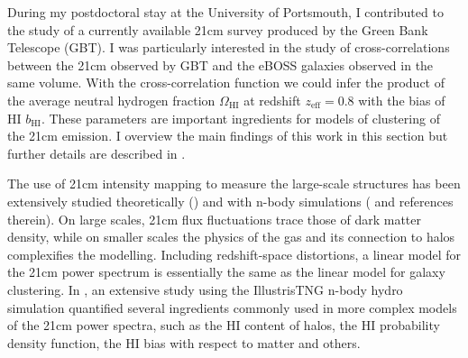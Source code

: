During my postdoctoral stay at the University of Portsmouth, 
I contributed to the study of a currently available 21cm survey produced by the Green Bank Telescope (GBT).
I was particularly interested in the study of cross-correlations between the 21cm 
observed by GBT and the eBOSS galaxies observed in the same volume. 
With the cross-correlation function we could infer the product of the average neutral hydrogen fraction 
$\Omega_\text{HI}$ at redshift $z_\text{eff} = 0.8$ with the bias of HI $b_\text{HI}$.  
These parameters are important ingredients for models of clustering of the 21cm emission.
I overview the main findings of this work in this section but further details 
are described in \cite{wolzConstraintsCrosscorrelationEBOSS2022}. 

The use of 21cm intensity mapping to measure the large-scale structures has been 
extensively studied theoretically 
(\cite{bharadwajUsingHIProbe2001,
battyeNeutralHydrogenSurveys2004,
mcquinnCosmologicalParameterEstimation2006,
changBaryonAcousticOscillation2008a}) 
and with n-body simulations 
(\cite{mesinger21CMFASTFastSeminumerical2011,
villaescusa-navarroIngredients21Cm2018} and references therein). 
On large scales, 21cm flux fluctuations trace those of dark matter density, while on smaller scales 
the physics of the gas and its connection to halos complexifies the modelling.  
Including redshift-space distortions, a linear model for the 21cm power spectrum is essentially the 
same as the linear model for galaxy clustering. 
In \cite{villaescusa-navarroIngredients21Cm2018}, an extensive study using the IllustrisTNG 
n-body hydro simulation quantified several ingredients commonly used in more complex models of 
the 21cm power spectra, such as the HI content of halos, the HI probability density function, 
the HI bias with respect to matter and others. 


